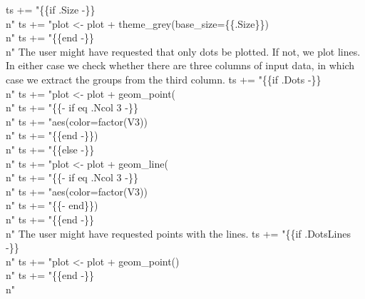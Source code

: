 ts += "\{\{if .Size -\}\}\\n"
ts += "plot <- plot + theme_grey(base_size=\{\{.Size\}\})\\n"
ts += "\{\{end -\}\}\\n"
\nwendcode{}\nwdocspar
The user might have requested that only dots be plotted. If not, we
plot lines. In either case we check whether there are three columns of
input data, in which case we extract the groups from the third column.
\nwenddocs{}\plusendmoddef\nwstartdeflinemarkup{}\nwenddeflinemarkup
ts += "\{\{if .Dots -\}\}\\n"
ts += "plot <- plot + geom_point(\\n"
ts += "\{\{- if eq .Ncol 3 -\}\}\\n"
ts += "aes(color=factor(V3))\\n"
ts += "\{\{end -\}\})\\n"
ts += "\{\{else -\}\}\\n"
ts += "plot <- plot + geom_line(\\n"
ts += "\{\{- if eq .Ncol 3 -\}\}\\n"
ts += "aes(color=factor(V3))\\n"
ts += "\{\{- end\}\})\\n"
ts += "\{\{end -\}\}\\n"
\nwendcode{}\nwdocspar
The user might have requested points with the lines.
\nwenddocs{}\plusendmoddef\nwstartdeflinemarkup{}\nwenddeflinemarkup
ts += "\{\{if .DotsLines -\}\}\\n"
ts += "plot <- plot + geom_point()\\n"
ts += "\{\{end -\}\}\\n"
\nwendcode{}\nwdocspar
